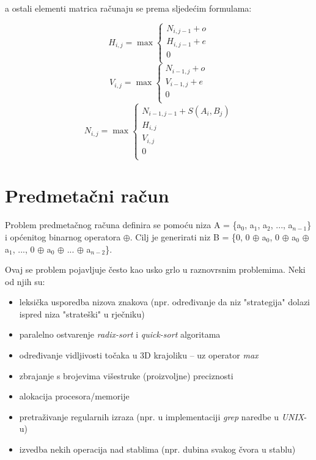 \documentclass[times, utf8, zavrsni, numeric]{fer}
\begin{document}
a ostali elementi matrica računaju se prema sljedećim formulama:
\begin{center}
\begin{equation}
H_{i,j} = \max \left\{
	\begin{array}{lr}
		N_{i,j-1} + o \\
		H_{i, j-1} + e \\
		0\\
	\end{array}
\right.
\end{equation}
\begin{equation}
V_{i,j} = \max \left\{
	\begin{array}{lr}
		N_{i-1,j} + o \\
		V_{i-1, j} + e \\
		0\\
	\end{array}
\right.
\end{equation}
\begin{equation}
N_{i,j} = \max \left\{
	\begin{array}{lr}
		N_{i-1,j-1} + S(A_{i}, B_{j}) \\
		H_{i, j}\\
		V_{i, j}\\
		0\\
	\end{array}
\right.
\end{equation}
\end{center}

\chapter{Predmetačni račun}
\indent

Problem predmetačnog računa definira se pomoću niza A = \{a$_{0}$, a$_{1}$, a$_{2}$, ..., a$_{n-1}$\} i općenitog binarnog operatora $\oplus$. Cilj je generirati niz B = \{0, 0 $\oplus$ a$_{0}$, 0 $\oplus$ a$_{0}$ $\oplus$ a$_{1}$, ..., 0 $\oplus$ a$_{0}$ $\oplus$ ... $\oplus$ a$_{n-2}$\}.

Ovaj se problem pojavljuje često kao usko grlo u raznovrsnim problemima. Neki od njih su:
\begin{itemize}
\item leksička usporedba nizova znakova (npr. određivanje da niz "strategija" dolazi ispred niza "strateški" u rječniku)
\item paralelno ostvarenje \textit{radix-sort} i \textit{quick-sort} algoritama
\item određivanje vidljivosti točaka u 3D krajoliku – uz operator \textit{max}
\item zbrajanje s brojevima višestruke (proizvoljne) preciznosti
\item alokacija procesora/memorije
\item pretraživanje regularnih izraza (npr. u implementaciji \textit{grep} naredbe u \textit{UNIX}-u)
\item izvedba nekih operacija nad stablima (npr. dubina svakog čvora u stablu)
\end{itemize}
\end{document}
